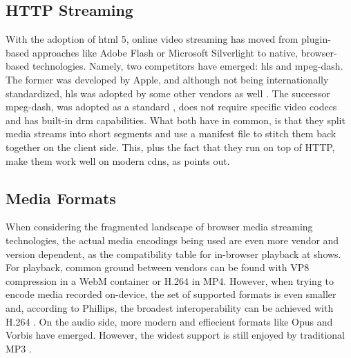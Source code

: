 \subsection{HTTP Streaming}
\label{subsec:http-streaming}

With the adoption of \gls{html} 5, online video streaming has moved from plugin-based approaches like Adobe Flash \cite{adobe-flash} or Microsoft Silverlight \cite{microsoft-silverlight} to native, browser-based technologies. Namely, two competitors have emerged: \gls{hls} and \gls{mpeg-dash}. The former was developed by Apple, and although not being internationally standardized, \gls{hls} was adopted by some other vendors as well \cite{caniuse-hls}. The successor \gls{mpeg-dash}, was adopted as a standard \cite{iso-mpeg-dash}, does not require specific video codecs and has built-in \gls{drm} capabilities. What both have in common, is that they split media streams into short segments and use a manifest file to stitch them back together on the client side. This, plus the fact that they run on top of HTTP, make them work well on modern \glspl{cdn}, as \cite{hls-vs-dash} points out.

\subsection{Media Formats}

When considering the fragmented landscape of browser media streaming technologies, the actual media encodings being used are even more vendor and version dependent, as the compatibility table for in-browser playback at \cite{media-format-browser-compat} shows. For playback, common ground between vendors can be found with VP8 compression in a WebM container or H.264 in MP4. However, when trying to encode media recorded on-device, the set of supported formats is even smaller and, according to Phillips, the broadest interoperability can be achieved with H.264 \cite[\S5.1]{webrtc-hacks-safari}. On the audio side, more modern and effiecient formats like Opus and Vorbis have emerged. However, the widest support is still enjoyed by traditional MP3 \cite{media-format-browser-compat}.
